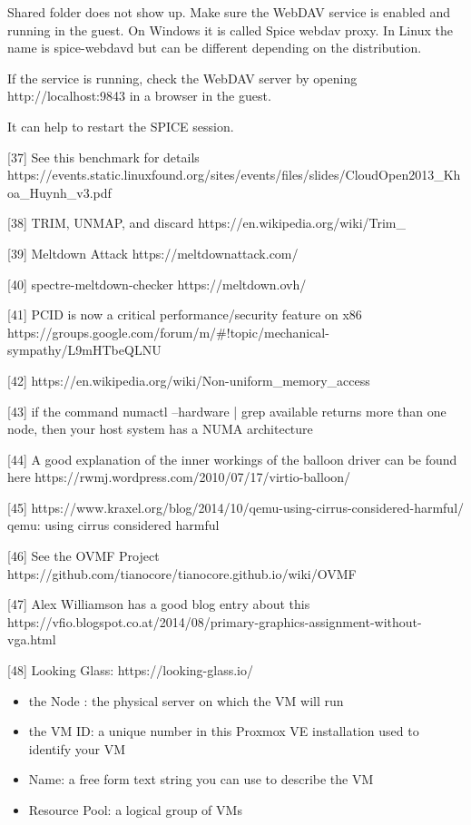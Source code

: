 Shared folder does not show up. Make sure the WebDAV service is enabled and running in the guest. On Windows it is called Spice webdav proxy. In Linux the name is spice-webdavd but can be different depending on the distribution.

If the service is running, check the WebDAV server by opening http://localhost:9843 in a browser in the guest.

It can help to restart the SPICE session.

[37] See this benchmark for details https://events.static.linuxfound.org/sites/events/files/slides/CloudOpen2013_Khoa_Huynh_v3.pdf

[38] TRIM, UNMAP, and discard https://en.wikipedia.org/wiki/Trim_%

[39] Meltdown Attack https://meltdownattack.com/

[40] spectre-meltdown-checker https://meltdown.ovh/

[41] PCID is now a critical performance/security feature on x86 https://groups.google.com/forum/m/#!topic/mechanical-sympathy/L9mHTbeQLNU

[42] https://en.wikipedia.org/wiki/Non-uniform_memory_access

[43] if the command numactl --hardware | grep available returns more than one node, then your host system has a NUMA architecture

[44] A good explanation of the inner workings of the balloon driver can be found here https://rwmj.wordpress.com/2010/07/17/virtio-balloon/

[45] https://www.kraxel.org/blog/2014/10/qemu-using-cirrus-considered-harmful/ qemu: using cirrus considered harmful

[46] See the OVMF Project https://github.com/tianocore/tianocore.github.io/wiki/OVMF

[47] Alex Williamson has a good blog entry about this https://vfio.blogspot.co.at/2014/08/primary-graphics-assignment-without-vga.html

[48] Looking Glass: https://looking-glass.io/

\begin{itemize}[leftmargin=2cm]

	\item the Node : the physical server on which the VM will run

	\item the VM ID: a unique number in this Proxmox VE installation used to identify your VM

	\item Name: a free form text string you can use to describe the VM

	\item Resource Pool: a logical group of VMs

\end{itemize}

